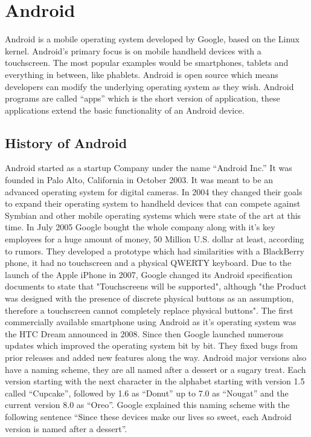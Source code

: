 \chapter{Android}
\label{ch:Android}
Android is a mobile operating system developed by Google, based on the Linux kernel. Android's primary focus is on mobile handheld devices with a touchscreen. The most popular examples would be smartphones, tablets and everything in between, like phablets. Android is open source which means developers can modify the underlying operating system as they wish. Android programs are called ``apps'' which is the short version of application, these applications extend the basic functionality of an Android device.

\section{History of Android}
Android started as a startup Company under the name ``Android Inc.'' It was founded in Palo Alto, California in October 2003. It was meant to be an advanced operating system for digital cameras. In 2004 they changed their goals to expand their operating system to handheld devices that can compete against Symbian and other mobile operating systems which were state of the art at this time. In July 2005 Google bought the whole company along with it's key employees for a huge amount of money, 50 Million U.S. dollar at least, according to rumors. They developed a prototype which had similarities with a BlackBerry phone, it had no touchscreen and a physical QWERTY keyboard. Due to the launch of the Apple iPhone in 2007, Google changed its Android specification documents to state that "Touchscreens will be supported", although "the Product was designed with the presence of discrete physical buttons as an assumption, therefore a touchscreen cannot completely replace physical buttons". The first commercially available smartphone using Android as it's operating system was the HTC Dream announced in 2008. Since then Google launched numerous updates which improved the operating system bit by bit. They fixed bugs from prior releases and added new features along the way. Android major versions also have a naming scheme, they are all named after a dessert or a sugary treat. Each version starting with the next character in the alphabet starting with version 1.5 called ``Cupcake'', followed by 1.6 as ``Donut'' up to 7.0 as ``Nougat'' and the current version 8.0 as ``Oreo''. Google explained this naming scheme with the following sentence ``Since these devices make our lives so sweet, each Android version is named after a dessert''.


